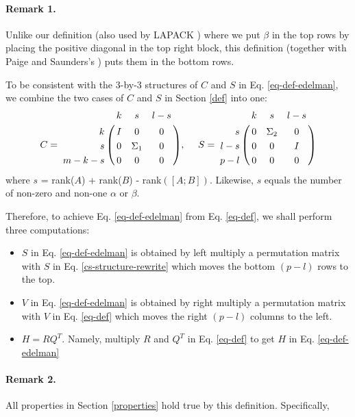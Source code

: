         \paragraph{Remark 1.}
            Unlike our definition (also used by LAPACK \cite[pp.~23--24]{anderson1999lapack}) where we put $\beta$ in the top rows by placing the positive diagonal in the top right block, this definition (together with Paige and Saunders's \cite[pp.~401]{paige1981towards}) puts them in the bottom rows. \cite[pp.~29]{edelman2019gsvd}
            
            To be consistent with the 3-by-3 structures of $C$ and $S$ in Eq. \eqref{eq-def-edelman}, we combine the two cases of $C$ and $S$ in Section \ref{def} into one: 
            \begin{align} \label{cs-structure-rewrite}
                C = \bordermatrix{ & k & s & l-s  \cr
                    \hfill k & I & 0 & 0\cr
                    \hfill s & 0 & \Sigma_1 & 0\cr
                    \hfill m-k-s & 0 & 0 & 0}, \  \ \ \
                S = \bordermatrix{ & k & s & l-s \cr
                    \hfill s & 0 & \Sigma_2 & 0\cr
                    \hfill l-s & 0 & 0 & I\cr
                    \hfill p-l & 0 & 0 & 0}
            \end{align}
            where $s$ = rank($A$) + rank($B$) - rank$([A; B])$. Likewise, $s$ equals the number of non-zero and non-one $\alpha$ or $\beta$. \vspace{5pt}
            
            Therefore, to achieve Eq. \eqref{eq-def-edelman} from Eq. \eqref{eq-def}, we shall perform three computations:
            \begin{itemize}
                \item $S$ in Eq. \eqref{eq-def-edelman} is obtained by left multiply a permutation matrix with $S$ in Eq. \eqref{cs-structure-rewrite} which moves the bottom $(p-l)$ rows to the top. 
                \item $V$ in Eq. \eqref{eq-def-edelman} is obtained by right multiply a permutation matrix with $V$ in Eq. \eqref{eq-def} which moves the right $(p-l)$ columns to the left.                
                \item $H = RQ^T$. Namely, multiply $R$ and $Q^{T}$ in Eq. \eqref{eq-def} to get $H$ in Eq. \eqref{eq-def-edelman} 
            \end{itemize}
            
            
        
        \paragraph{Remark 2.}
            All properties in Section \ref{properties} hold true by this definition. Specifically,
            
